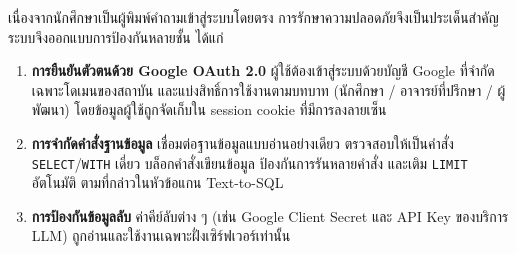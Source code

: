 เนื่องจากนักศึกษาเป็นผู้พิมพ์คำถามเข้าสู่ระบบโดยตรง การรักษาความปลอดภัยจึงเป็นประเด็นสำคัญ ระบบจึงออกแบบการป้องกันหลายชั้น ได้แก่

\begin{enumerate}
    \item \textbf{การยืนยันตัวตนด้วย Google OAuth 2.0} ผู้ใช้ต้องเข้าสู่ระบบด้วยบัญชี Google ที่จำกัดเฉพาะโดเมนของสถาบัน และแบ่งสิทธิ์การใช้งานตามบทบาท (นักศึกษา / อาจารย์ที่ปรึกษา / ผู้พัฒนา) โดยข้อมูลผู้ใช้ถูกจัดเก็บใน session cookie ที่มีการลงลายเซ็น
    \item \textbf{การจำกัดคำสั่งฐานข้อมูล} เชื่อมต่อฐานข้อมูลแบบอ่านอย่างเดียว ตรวจสอบให้เป็นคำสั่ง \texttt{SELECT}/\texttt{WITH} เดี่ยว บล็อกคำสั่งเขียนข้อมูล ป้องกันการรันหลายคำสั่ง และเติม \texttt{LIMIT} อัตโนมัติ ตามที่กล่าวในหัวข้อแกน Text-to-SQL
    \item \textbf{การป้องกันข้อมูลลับ} ค่าคีย์ลับต่าง ๆ (เช่น Google Client Secret และ API Key ของบริการ LLM) ถูกอ่านและใช้งานเฉพาะฝั่งเซิร์ฟเวอร์เท่านั้น
\end{enumerate}

